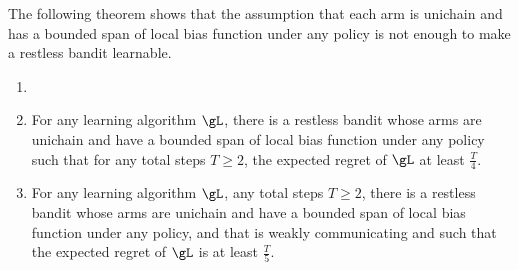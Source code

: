The following theorem shows that the assumption that each arm is unichain and has a bounded span of local bias function under any policy is not enough to make a restless bandit learnable.

\begin{thm}
    \label{thm:non_learnable}
    \begin{enumerate}[label=(\roman*)]
        \item[]
        \item \label{it:non_learnable1} For any learning algorithm $\gL$, there is a restless bandit whose arms are unichain and have a bounded span of local bias function under any policy such that for any total steps $T\ge2$, the expected regret of $\gL$ at least $\frac{T}4$.
        \item \label{it:non_learnable2} For any learning algorithm $\gL$, any total steps $T\ge2$, there is a restless bandit whose arms are unichain and have a bounded span of local bias function under any policy, and that is weakly communicating and such that the expected regret of $\gL$ is at least $\frac{T}5$.
    \end{enumerate}
\end{thm}
